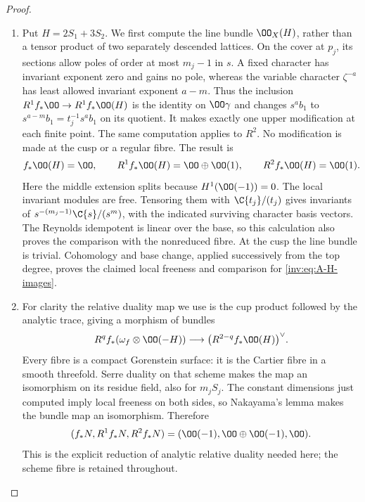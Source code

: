 \begin{proof}
\begin{enumerate}[label=\arabic*.,leftmargin=*]
\item Put $H=2S_1+3S_2$.  We first compute the line bundle $\OO_X(H)$,
rather than a tensor product of two separately descended lattices.
On the cover at $p_j$, its sections allow poles of order at most $m_j-1$
in $s$.  A fixed character has invariant exponent zero and gains no
pole, whereas the variable character $\zeta^{-a}$ has least allowed
invariant exponent $a-m$.  Thus the inclusion
$R^1f_*\OO\to R^1f_*\OO(H)$ is the identity on $\OO\gamma$ and
changes $s^ab_1$ to $s^{a-m}b_1=t_j^{-1}s^ab_1$ on its quotient.
It makes exactly one upper modification at each finite point.
The same computation applies to $R^2$.  No modification is made at
the cusp or a regular fibre.  The result is
\begin{equation}\label{inv:eq:A-H-images}
f_*\OO(H)=\OO,\qquad
R^1f_*\OO(H)=\OO\oplus\OO(1),\qquad
R^2f_*\OO(H)=\OO(1).
\end{equation}
Here the middle extension splits because $H^1(\OO(-1))=0$.
The local invariant modules are free.  Tensoring them with
$\C\{t_j\}/(t_j)$ gives invariants of
$s^{-(m_j-1)}\C\{s\}/(s^m)$, with the indicated surviving character
basis vectors.  The Reynolds idempotent is linear over the base,
so this calculation also proves the comparison with the nonreduced
fibre.  At the cusp the line bundle is trivial.  Cohomology and base
change, applied successively from the top degree, proves the claimed
local freeness and comparison for \eqref{inv:eq:A-H-images}.

\item For clarity the relative duality map we use is the cup product followed
by the analytic trace, giving a morphism of bundles
\[
R^qf_*(\omega_f\otimes\OO(-H))\longrightarrow
\bigl(R^{2-q}f_*\OO(H)\bigr)^\vee.
\]
Every fibre is a compact Gorenstein surface: it is the Cartier fibre
in a smooth threefold.  Serre duality on that scheme makes the map
an isomorphism on its residue field, also for $m_jS_j$.  The constant
dimensions just computed imply local freeness on both sides, so
Nakayama's lemma makes the bundle map an isomorphism.  Therefore
\begin{equation}\label{inv:eq:A-N-images}
(f_*N,R^1f_*N,R^2f_*N)
=(\OO(-1),\OO\oplus\OO(-1),\OO).
\end{equation}
This is the explicit reduction of analytic relative duality needed
here; the scheme fibre is retained throughout.


\end{enumerate}
\end{proof}

